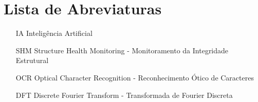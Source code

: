 


\chapter{Lista de Abreviaturas}

%

\begin{itemize}

\item[IA] Inteligência Artificial
\item[SHM] Structure Health Monitoring - Monitoramento da Integridade Estrutural
\item[OCR] Optical Character Recognition - Reconhecimento Ótico de Caracteres
\item[DFT] Discrete Fourier Transform - Transformada de Fourier Discreta

\end{itemize}

